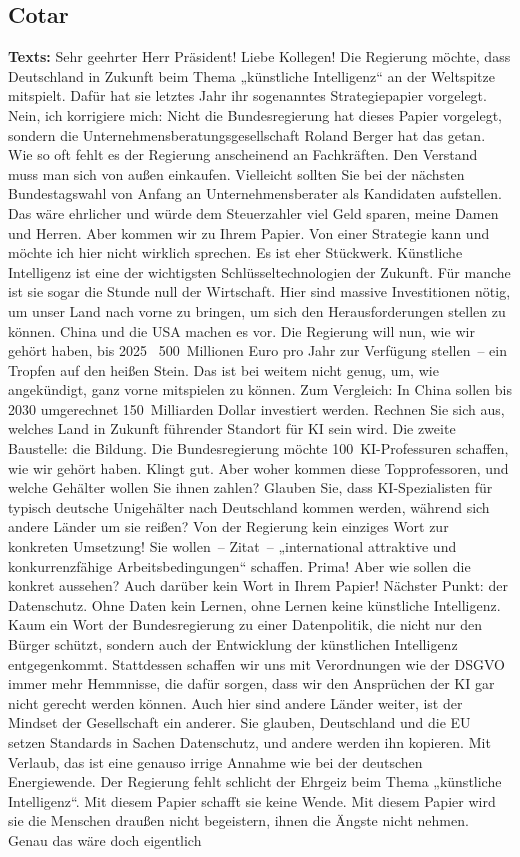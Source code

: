 \documentclass{article}
\begin{document}
\subsection{Cotar}
\noindent\textbf{Texts:} Sehr geehrter Herr Präsident! Liebe Kollegen! Die Regierung möchte, dass Deutschland in Zukunft beim Thema „künstliche Intelligenz“ an der Weltspitze mitspielt. Dafür hat sie letztes Jahr ihr sogenanntes Strategiepapier vorgelegt. Nein, ich korrigiere mich: Nicht die Bundesregierung hat dieses Papier vorgelegt, sondern die Unternehmensberatungsgesellschaft Roland Berger hat das getan. Wie so oft fehlt es der Regierung anscheinend an Fachkräften. Den Verstand muss man sich von außen einkaufen. Vielleicht sollten Sie bei der nächsten Bundestagswahl von Anfang an Unternehmensberater als Kandidaten aufstellen. Das wäre ehrlicher und würde dem Steuerzahler viel Geld sparen, meine Damen und Herren.  Aber kommen wir zu Ihrem Papier. Von einer Strategie kann und möchte ich hier nicht wirklich sprechen. Es ist eher Stückwerk. Künstliche Intelligenz ist eine der wichtigsten Schlüsseltechnologien der Zukunft. Für manche ist sie sogar die Stunde null der Wirtschaft. Hier sind massive Investitionen nötig, um unser Land nach vorne zu bringen, um sich den Herausforderungen stellen zu können. China und die USA machen es vor. Die Regierung will nun, wie wir gehört haben, bis 2025  500 Millionen Euro pro Jahr zur Verfügung stellen – ein Tropfen auf den heißen Stein. Das ist bei weitem nicht genug, um, wie angekündigt, ganz vorne mitspielen zu können. Zum Vergleich: In China sollen bis 2030 umgerechnet 150 Milliarden Dollar investiert werden. Rechnen Sie sich aus, welches Land in Zukunft führender Standort für KI sein wird.  Die zweite Baustelle: die Bildung. Die Bundesregierung möchte 100 KI-Professuren schaffen, wie wir gehört haben. Klingt gut. Aber woher kommen diese Topprofessoren, und welche Gehälter wollen Sie ihnen zahlen? Glauben Sie, dass KI-Spezialisten für typisch deutsche Unigehälter nach Deutschland kommen werden, während sich andere Länder um sie reißen? Von der Regierung kein einziges Wort zur konkreten Umsetzung! Sie wollen – Zitat – „international attraktive und konkurrenzfähige Arbeitsbedingungen“ schaffen. Prima! Aber wie sollen die konkret aussehen? Auch darüber kein Wort in Ihrem Papier! Nächster Punkt: der Datenschutz. Ohne Daten kein Lernen, ohne Lernen keine künstliche Intelligenz. Kaum ein Wort der Bundesregierung zu einer Datenpolitik, die nicht nur den Bürger schützt, sondern auch der Entwicklung der künstlichen Intelligenz entgegenkommt. Stattdessen schaffen wir uns mit Verordnungen wie der DSGVO immer mehr Hemmnisse, die dafür sorgen, dass wir den Ansprüchen der KI gar nicht gerecht werden können.  Auch hier sind andere Länder weiter, ist der Mindset der Gesellschaft ein anderer. Sie glauben, Deutschland und die EU setzen Standards in Sachen Datenschutz, und andere werden ihn kopieren. Mit Verlaub, das ist eine genauso irrige Annahme wie bei der deutschen Energiewende.  Der Regierung fehlt schlicht der Ehrgeiz beim Thema „künstliche Intelligenz“. Mit diesem Papier schafft sie keine Wende. Mit diesem Papier wird sie die Menschen draußen nicht begeistern, ihnen die Ängste nicht nehmen. Genau das wäre doch eigentlich 
\end{document}
